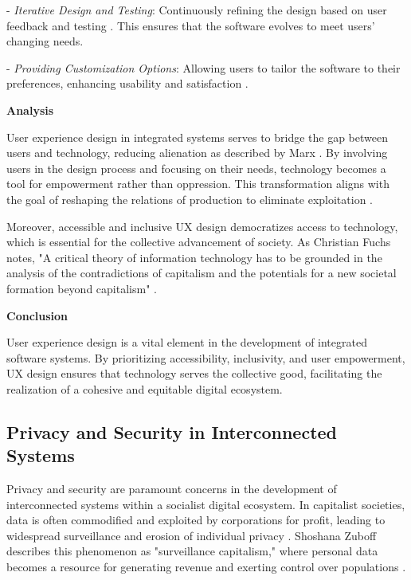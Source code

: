 \begin{refsection}
- \textit{Iterative Design and Testing}: Continuously refining the design based on user feedback and testing \cite[pp.~62-64]{Rogers2011}. This ensures that the software evolves to meet users' changing needs.

- \textit{Providing Customization Options}: Allowing users to tailor the software to their preferences, enhancing usability and satisfaction \cite[pp.~89-91]{Shneiderman2013}.

\textbf{Analysis}

User experience design in integrated systems serves to bridge the gap between users and technology, reducing alienation as described by Marx \cite[pp.~74-76]{Marx1844}. By involving users in the design process and focusing on their needs, technology becomes a tool for empowerment rather than oppression. This transformation aligns with the goal of reshaping the relations of production to eliminate exploitation \cite[pp.~477-478]{Marx1867}.

Moreover, accessible and inclusive UX design democratizes access to technology, which is essential for the collective advancement of society. As Christian Fuchs notes, "A critical theory of information technology has to be grounded in the analysis of the contradictions of capitalism and the potentials for a new societal formation beyond capitalism" \cite[pp.~120-122]{Fuchs2014}.

\textbf{Conclusion}

User experience design is a vital element in the development of integrated software systems. By prioritizing accessibility, inclusivity, and user empowerment, UX design ensures that technology serves the collective good, facilitating the realization of a cohesive and equitable digital ecosystem.

\subsection{Privacy and Security in Interconnected Systems}

Privacy and security are paramount concerns in the development of interconnected systems within a socialist digital ecosystem. In capitalist societies, data is often commodified and exploited by corporations for profit, leading to widespread surveillance and erosion of individual privacy \cite[pp.~8-9]{Zuboff2020}. Shoshana Zuboff describes this phenomenon as "surveillance capitalism," where personal data becomes a resource for generating revenue and exerting control over populations \cite[pp.~32-34]{Zuboff2020}.


\end{refsection}
